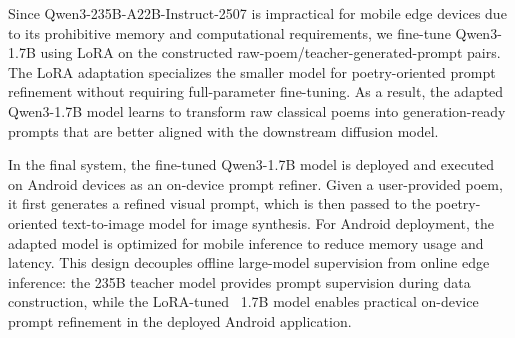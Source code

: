 Since Qwen3-235B-A22B-Instruct-2507 is impractical for mobile edge devices due to its prohibitive memory and computational requirements, we fine-tune Qwen3-1.7B using LoRA on the constructed raw-poem/teacher-generated-prompt pairs. The LoRA adaptation specializes the smaller model for poetry-oriented prompt refinement without requiring full-parameter fine-tuning. As a result, the adapted Qwen3-1.7B model learns to transform raw classical poems into generation-ready prompts that are better aligned with the downstream diffusion model.

In the final system, the fine-tuned Qwen3-1.7B model is deployed and executed on Android devices as an on-device prompt refiner. Given a user-provided poem, it first generates a refined visual prompt, which is then passed to the poetry-oriented text-to-image model for image synthesis. For Android deployment, the adapted model is optimized for mobile inference to reduce memory usage and latency. This design decouples offline large-model supervision from online edge inference: the 235B teacher model provides prompt supervision during data construction, while the LoRA-tuned~\cite{hu2024lora} 1.7B model enables practical on-device prompt refinement in the deployed Android application.